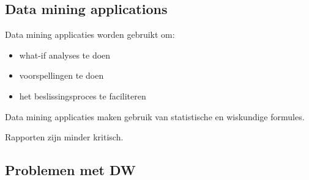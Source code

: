 \documentclass[a4paper,12pt]{article}
\begin{document}
\subsection{Data mining applications}
Data mining applicaties worden gebruikt om:
\begin{itemize}
\item what-if analyses te doen
\item voorspellingen te doen
\item het beslissingsproces te faciliteren
\end{itemize}

Data mining applicaties maken gebruik van statistische en wiskundige formules.

Rapporten zijn minder kritisch.

\subsection{Problemen met DW}
\end{document}
